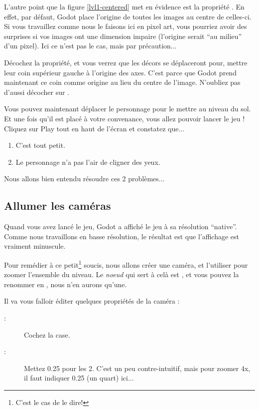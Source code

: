 L'autre point que la figure \ref{lvl1-centered} met en évidence est la propriété . En effet, par défaut, Godot place l'origine de toutes les images au centre de celles-ci. Si vous travaillez comme nous le faisons ici en pixel art, vous pourriez avoir des surprises si vos images ont une dimension impaire (l'origine serait ``au milieu'' d'un pixel). Ici ce n'est pas le cas, mais par précaution...

Décochez la propriété, et vous verrez que les décors se déplaceront pour, mettre leur coin supérieur gauche à l'origine des axes. C'est parce que Godot prend maintenant ce coin comme origine au lieu du centre de l'image. N'oubliez pas d'aussi décocher  sur .

Vous pouvez maintenant déplacer le personnage pour le mettre au niveau du sol. Et une fois qu'il est placé à votre convenance, vous allez pouvoir lancer le jeu ! Cliquez sur Play tout en haut de l'écran et constatez que...

\begin{enumerate}
\item C'est tout petit.
\item Le personnage n'a pas l'air de cligner des yeux.
\end{enumerate}

Nous allons bien entendu résoudre ces 2 problèmes...

\subsection{Allumer les caméras}

Quand vous avez lancé le jeu, Godot a affiché le jeu à sa résolution ``native''. Comme nous travaillons en basse résolution, le résultat est que l'affichage est vraiment minuscule.

Pour remédier à ce petit\footnote{C'est le cas de le dire!} soucis, nous allons créer une caméra, et l'utiliser pour zoomer l'ensemble du niveau. Le \emph{noeud} qui sert à celà est , et vous pouvez la renommer en , nous n'en aurons qu'une.

Il va vous falloir éditer quelques propriétés de la caméra :

\begin{description}
\item[ :] Cochez la case.
\item[ :] Mettez 0.25 pour les 2. C'est un peu contre-intuitif, mais pour zoomer 4x, il faut indiquer 0.25 (un quart) ici...
\end{description}

